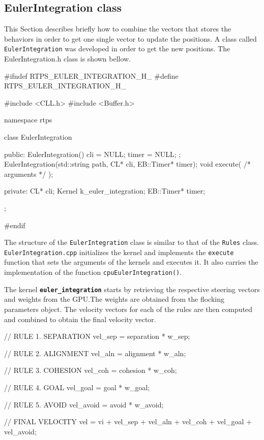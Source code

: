 


\subsection{EulerIntegration class}
This Section describes briefly how to combine the vectors that stores the behaviors in order to get one single vector to update the positions. A class called \texttt{EulerIntegration} was developed in order to get the new positions. The {EulerIntegration.h} class is shown bellow.

\begin{cppcode}{0}
#ifndef RTPS_EULER_INTEGRATION_H_
#define RTPS_EULER_INTEGRATION_H_

#include <CLL.h>
#include <Buffer.h>

namespace rtps
{
	class EulerIntegration
	{
		public:
			EulerIntegration() { cli = NULL; timer = NULL; };
	 		EulerIntegration(std::string path, CL* cli, EB::Timer* timer);
			void execute( /* arguments */ );

		private:
			CL* cli;
			Kernel k_euler_integration;
			EB::Timer* timer;
	};
}
#endif
\end{cppcode}

The structure of the \texttt{EulerIntegration} class is similar to that of the \texttt{Rules} class. \texttt{EulerIntegration.cpp} initializes the kernel and implements the \texttt{execute} function that sets the arguments of the kernels and executes it. It also carries the implementation of the function \texttt{cpuEulerIntegration()}. 

The kernel \texttt{\textbf{euler\_integration}} starts by retrieving the respective steering vectors and weights from the GPU.The weights are obtained from the flocking parameters object. The velocity vectors for each of the rules are then computed and combined to obtain the final velocity vector.

\begin{cppcode}{0}
// RULE 1. SEPARATION
vel_sep = separation * w_sep;
   
// RULE 2. ALIGNMENT
vel_aln = alignment * w_aln;

// RULE 3. COHESION
vel_coh = cohesion * w_coh;

// RULE 4. GOAL
vel_goal = goal * w_goal;

// RULE 5. AVOID
vel_avoid = avoid * w_avoid;

// FINAL VELOCITY
vel = vi + vel_sep + vel_aln + vel_coh + vel_goal + vel_avoid;
\end{cppcode}


